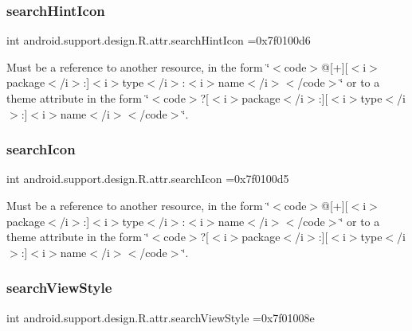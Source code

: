 \subsubsection{\texorpdfstring{search\+Hint\+Icon}{searchHintIcon}}
{\footnotesize\ttfamily int android.\+support.\+design.\+R.\+attr.\+search\+Hint\+Icon =0x7f0100d6\hspace{0.3cm}{\ttfamily [static]}}

Must be a reference to another resource, in the form \char`\"{}$<$code$>$@\mbox{[}+\mbox{]}\mbox{[}$<$i$>$package$<$/i$>$\+:\mbox{]}$<$i$>$type$<$/i$>$\+:$<$i$>$name$<$/i$>$$<$/code$>$\char`\"{} or to a theme attribute in the form \char`\"{}$<$code$>$?\mbox{[}$<$i$>$package$<$/i$>$\+:\mbox{]}\mbox{[}$<$i$>$type$<$/i$>$\+:\mbox{]}$<$i$>$name$<$/i$>$$<$/code$>$\char`\"{}. \mbox{\label{classandroid_1_1support_1_1design_1_1R_1_1attr_a086a4c10a5ff7204fc9c9035a77d0c50}} 
\subsubsection{\texorpdfstring{search\+Icon}{searchIcon}}
{\footnotesize\ttfamily int android.\+support.\+design.\+R.\+attr.\+search\+Icon =0x7f0100d5\hspace{0.3cm}{\ttfamily [static]}}

Must be a reference to another resource, in the form \char`\"{}$<$code$>$@\mbox{[}+\mbox{]}\mbox{[}$<$i$>$package$<$/i$>$\+:\mbox{]}$<$i$>$type$<$/i$>$\+:$<$i$>$name$<$/i$>$$<$/code$>$\char`\"{} or to a theme attribute in the form \char`\"{}$<$code$>$?\mbox{[}$<$i$>$package$<$/i$>$\+:\mbox{]}\mbox{[}$<$i$>$type$<$/i$>$\+:\mbox{]}$<$i$>$name$<$/i$>$$<$/code$>$\char`\"{}. \mbox{\label{classandroid_1_1support_1_1design_1_1R_1_1attr_a7563597120eec32553578260707cea59}} 
\subsubsection{\texorpdfstring{search\+View\+Style}{searchViewStyle}}
{\footnotesize\ttfamily int android.\+support.\+design.\+R.\+attr.\+search\+View\+Style =0x7f01008e\hspace{0.3cm}{\ttfamily [static]}}


